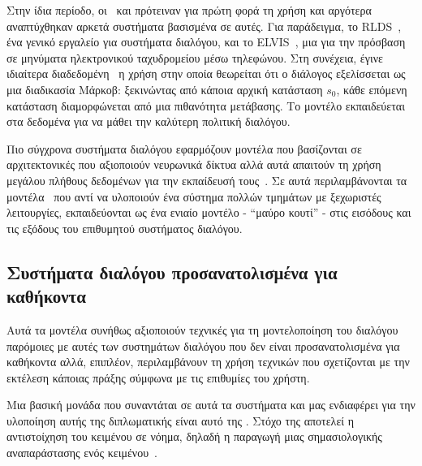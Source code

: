 Στην ίδια περίοδο, οι~\citet{levin1997stochastic} και \citet{levin1998using} πρότειναν για πρώτη φορά τη χρήση 
και αργότερα αναπτύχθηκαν αρκετά συστήματα βασισμένα σε αυτές.
Για παράδειγμα, το RLDS~\cite{singh2000reinforcement}, ένα γενικό εργαλείο για συστήματα διαλόγου,
και το ELVIS~\cite{walker1998learning}, μια  για την πρόσβαση σε μηνύματα ηλεκτρονικού ταχυδρομείου μέσω τηλεφώνου.
Στη συνέχεια, έγινε ιδιαίτερα διαδεδομένη~\cite{young2013pomdp,wang2016recent,roy2000spoken,young2002talking} η χρήση
στην οποία θεωρείται ότι ο διάλογος εξελίσσεται ως μια διαδικασία Μάρκοβ: ξεκινώντας από κάποια αρχική κατάσταση $s_0$, κάθε επόμενη κατάσταση διαμορφώνεται από μια πιθανότητα μετάβασης.
Το μοντέλο εκπαιδεύεται στα δεδομένα για να μάθει την καλύτερη πολιτική διαλόγου.

Πιο σύγχρονα συστήματα διαλόγου εφαρμόζουν μοντέλα που βασίζονται σε αρχιτεκτονικές που αξιοποιούν νευρωνικά δίκτυα αλλά αυτά απαιτούν τη χρήση μεγάλου πλήθους δεδομένων για την εκπαίδευσή τους~\cite{serban2015survey}.
Σε αυτά περιλαμβάνονται τα  μοντέλα~\cite{serban2015survey,serban2016building}
που αντί να υλοποιούν ένα σύστημα πολλών τμημάτων με ξεχωριστές λειτουργίες,
εκπαιδεύονται ως ένα ενιαίο μοντέλο - \enquote{μαύρο κουτί} - στις εισόδους και τις εξόδους του επιθυμητού συστήματος διαλόγου.

\subsection{Συστήματα διαλόγου προσανατολισμένα για καθήκοντα}\label{subsec:goal-driven-dialogue-systems}%
Αυτά τα μοντέλα συνήθως αξιοποιούν τεχνικές για τη μοντελοποίηση του διαλόγου παρόμοιες με αυτές των συστημάτων διαλόγου που δεν είναι προσανατολισμένα για καθήκοντα αλλά,
επιπλέον, περιλαμβάνουν τη χρήση τεχνικών που σχετίζονται με την εκτέλεση κάποιας πράξης σύμφωνα με τις επιθυμίες του χρήστη.

Μια βασική μονάδα που συναντάται σε αυτά τα συστήματα και μας ενδιαφέρει για την υλοποίηση αυτής της διπλωματικής είναι αυτό της
.
Στόχο της αποτελεί η αντιστοίχηση του κειμένου σε νόημα, δηλαδή η παραγωγή μιας σημασιολογικής αναπαράστασης ενός κειμένου~\cite{martin2009speech}.

